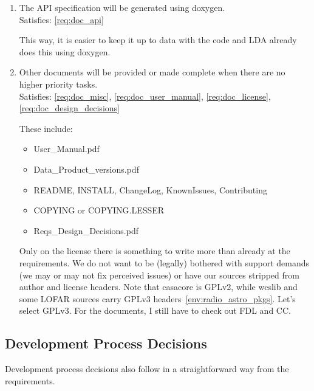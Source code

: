 \documentclass[a4paper,11pt]{article}
\begin{document}
\begin{enumerate}[resume, label=\it D.\arabic{*}]
\item \label{dsg:api_docs} The API specification will be generated using doxygen.\\
Satisfies: \ref{req:doc_api}

This way, it is easier to keep it up to data with the code and LDA already does this using doxygen.

\item \label{dsg:other_docs} Other documents will be provided or made complete when there are no higher priority tasks.\\
Satisfies: \ref{req:doc_misc}, \ref{req:doc_user_manual}, \ref{req:doc_license}, \ref{req:doc_design_decisions}

These include:
\begin{itemize}
\itemsep0em
\item User\_Manual.pdf
\item Data\_Product\_versions.pdf
\item README, INSTALL, ChangeLog, KnownIssues, Contributing
\item COPYING or COPYING.LESSER
\item Reqs\_Design\_Decisions.pdf
\end{itemize}
Only on the license there is something to write more than already at the requirements.
We do not want to be (legally) bothered with support demands (we may or may not fix perceived issues) or have our sources stripped from author and license headers.
Note that casacore is GPLv2, while wcslib and some LOFAR sources carry GPLv3 headers~\ref{env:radio_astro_pkgs}.
Let's select GPLv3.
For the documents, I still have to check out FDL and CC.

\end{enumerate}


\subsection{Development Process Decisions} \label{sec:dev_process_decisions}
Development process decisions also follow in a straightforward way from the requirements.
\end{document}
